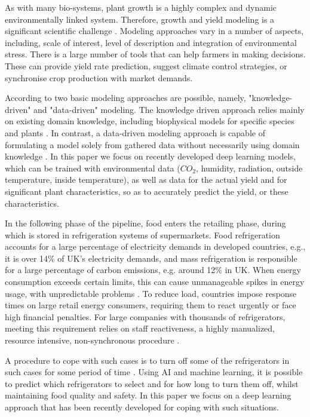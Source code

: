 \documentclass[journal,article,accept,moreauthors,pdftex]{Definitions/mdpi}
\begin{document}
As with many bio-systems, plant growth is a
highly complex and dynamic environmentally
linked system. Therefore, growth and yield
modeling is a significant scientific challenge \cite{ref107, ref72}.
Modeling approaches vary in a number of aspects, including, scale of interest, level of description and integration of environmental stress. There is a large number
of tools that can help farmers in making decisions. These can provide yield rate prediction,
suggest climate control strategies, or synchronise
crop production with market demands. 

According to \cite{ref73, ref56} two basic modeling approaches are possible, namely, "knowledge-driven" and "data-driven" modeling. The knowledge driven approach relies mainly on existing domain knowledge, including biophysical models for specific species and plants \cite{ref29, ref30}. In contrast, a data-driven modeling approach is capable of formulating a model solely from gathered data without necessarily using domain knowledge \cite{ref60}.
In this paper we focus on recently developed deep
learning models, which can be  trained with environmental data ($CO_2$, humidity,
radiation, outside temperature, inside temperature), as well as data for the actual yield and for significant plant characteristics, so as  to accurately predict the yield, or these characteristics. 

In the following phase of the pipeline, food enters the retailing phase, during which is stored in refrigeration systems of supermarkets. Food refrigeration accounts for a large percentage of electricity demands in developed countries, e.g., it is over 14\% of UK’s electricity demands, and mass refrigeration is responsible for a large percentage of carbon emissions, e.g. around 12\% in UK. When energy consumption exceeds certain limits, this can cause unmanageable spikes in energy usage, with unpredictable problems \cite{ref82, ref84}. To reduce load, countries impose response times on large retail energy consumers, requiring them to react urgently or face high financial penalties. For large companies with thousands of refrigerators, meeting this requirement relies on staff reactiveness, a highly manualized, resource intensive, non-synchronous procedure . 

A procedure to cope with such cases is to turn off some of the refrigerators in such cases for some period of time \cite{ref90, ref91}. Using AI and machine learning, it is possible to predict which refrigerators to select and for how long to turn them off, whilst  maintaining food quality and safety. In this paper we focus on a deep learning approach that has been recently developed for coping with such situations.   
\end{document}
